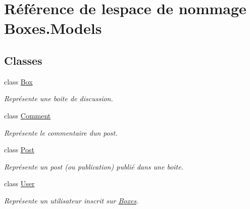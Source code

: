 \hypertarget{namespace_boxes_1_1_models}{}\section{Référence de l\textquotesingle{}espace de nommage Boxes.\+Models}
\label{namespace_boxes_1_1_models}
\subsection*{Classes}
\begin{DoxyCompactItemize}
\item 
class \hyperlink{class_boxes_1_1_models_1_1_box}{Box}
\begin{DoxyCompactList}\small\item\em Représente une boite de discussion. \end{DoxyCompactList}\item 
class \hyperlink{class_boxes_1_1_models_1_1_comment}{Comment}
\begin{DoxyCompactList}\small\item\em Représente le commentaire d\textquotesingle{}un post. \end{DoxyCompactList}\item 
class \hyperlink{class_boxes_1_1_models_1_1_post}{Post}
\begin{DoxyCompactList}\small\item\em Représente un post (ou publication) publié dans une boite. \end{DoxyCompactList}\item 
class \hyperlink{class_boxes_1_1_models_1_1_user}{User}
\begin{DoxyCompactList}\small\item\em Représente un utilisateur inscrit sur \hyperlink{namespace_boxes}{Boxes}. \end{DoxyCompactList}\end{DoxyCompactItemize}
